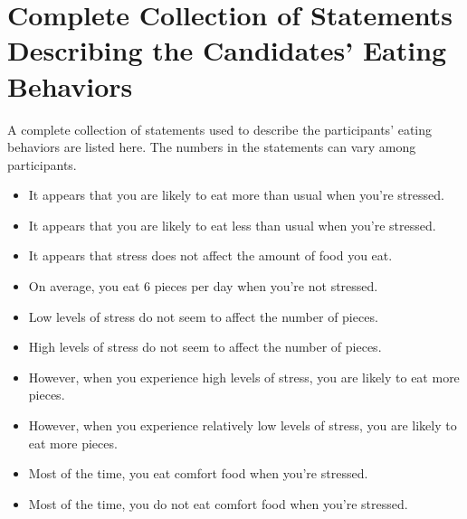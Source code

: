 \chapter{Complete Collection of Statements Describing the Candidates' Eating Behaviors}\label{collect-statement}
A complete collection of statements used to describe the participants' eating behaviors are listed here. The numbers in the statements can vary among participants.
\begin{itemize}
  \item It appears that you are likely to eat more than usual when you're stressed.
  \item It appears that you are likely to eat less than usual when you're stressed.
  \item It appears that stress does not affect the amount of food you eat.
  \item On average, you eat 6 pieces per day when you're not stressed.
  \item Low levels of stress do not seem to affect the number of pieces.
  \item High levels of stress do not seem to affect the number of pieces.
  \item However, when you experience high levels of stress, you are likely to eat more pieces.
  \item However, when you experience relatively low levels of stress, you are likely to eat more pieces.
  \item Most of the time, you eat comfort food when you're stressed.
  \item Most of the time, you do not eat comfort food when you're stressed.
\end{itemize}
